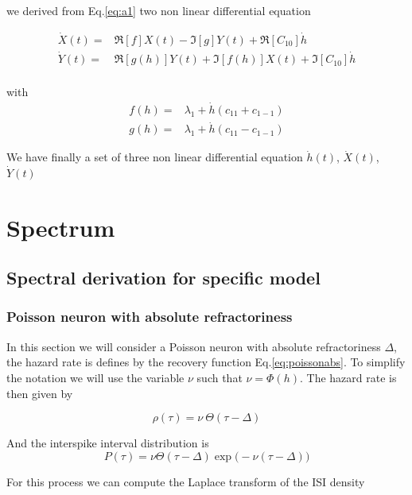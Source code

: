 \documentclass[12pt,twoside]{report}
\begin{document}
we derived from Eq.\eqref{eq:a1}  two non linear differential equation

\begin{align}
\dot{X}(t)=&\Re[f]X(t)-\Im[g]Y(t) +\Re[C_{10}]\dot{h}\\
\dot{Y}(t)=&\Re[g(h)]Y(t)+\Im[f(h)]X(t) +\Im[C_{10}]\dot{h}\\
\end{align}

with
\begin{align}
f(h)=&\lambda_1+ \dot{h}(c_{11}+c_{1-1})\\
g(h)=&\lambda_1+ \dot{h}(c_{11}-c_{1-1})
\end{align}

We have finally a set of three non linear differential equation $\dot{h}(t)$, $\dot{X}(t)$, $\dot{Y}(t)$


\chapter{Spectrum}
\section{Spectral derivation for specific model}
\label{sec:specif-model}


\subsection{Poisson neuron with absolute refractoriness}
\label{subsec:absref}


In this section we will consider a Poisson neuron with absolute refractoriness $\Delta$, the hazard rate is defines by the recovery function Eq.\eqref{eq:poissonabs}.
To simplify the notation we will use the variable $\nu$ such that $\nu=\Phi(h)$. The hazard rate is then given by

\begin{equation}
\rho(\tau)=\nu\:\Theta(\tau-\Delta)
\end{equation}


And the interspike interval distribution is 
\begin{equation}
P(\tau)=\nu \Theta(\tau-\Delta) \exp\big(-\nu(\tau-\Delta)\big)
\end{equation}



For this process we can compute the Laplace transform of the ISI density
\end{document}
